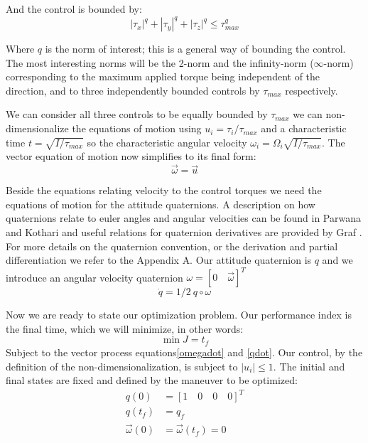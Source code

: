 And the control is bounded by:
\begin{equation}
|\tau_x|^q + |\tau_y|^q + |\tau_z|^q \leq \tau_{max}^q
\end{equation}

Where $q$ is the norm of interest; this is a general way of bounding the control.  The most interesting norms will be the 2-norm and the infinity-norm ($\infty$-norm) corresponding to the maximum applied torque being independent of the direction, and to three independently bounded controls by $\tau_{max}$ respectively.

We can consider all three controls to be equally bounded by $\tau_{max}$ we can non-dimensionalize the equations of motion using $u_i = \tau_i / \tau_{max}$ and a characteristic time $t=\sqrt{I / \tau_{max}}$ so the characteristic angular velocity $\omega_i = \Omega_i \sqrt{I / \tau_{max}}$. The vector equation of motion now simplifies to its final form:
\begin{equation}
\label{omegadot}
\vec{\omega} = \vec{u}
\end{equation}

Beside the equations relating velocity to the control torques we need the equations of motion for the attitude quaternions. A description on how quaternions relate to euler angles and angular velocities can be found in Parwana and Kothari\cite{parwana2017quaternion} and useful relations for quaternion derivatives are provided by Graf \cite{graf2008quaternions}. For more details on the quaternion convention, or the derivation and partial differentiation we refer to the Appendix A. Our attitude quaternion is $q$ and we introduce an angular velocity quaternion $\omega = [0 \quad \vec{\omega}]^T$
\begin{equation}
\label{qdot}
\dot{q} = 1/2  \ q \circ \omega
\end{equation}

Now we are ready to state our optimization problem. Our performance index is the final time, which we will minimize, in other words:
\begin{equation}
\min J = t_f
\end{equation}
Subject to the vector process equations\ref{omegadot} and  \ref{qdot}. Our control, by the definition of the non-dimensionalization, is subject to $|u_i| \leq 1$. The initial and final states are fixed and defined by the maneuver to be optimized:
\begin{align}
 q(0) &= \left[ 1 \quad 0 \quad 0 \quad 0 \right]^T \\
 q(t_f) &= q_f \\
 \vec{\omega}(0) &= \vec{\omega}(t_f) = 0
\end{align}

